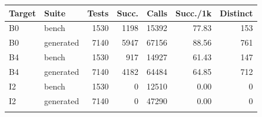 \begin{tabular}{@{}llrrrrr@{}}
\toprule
Target & Suite & Tests & Succ. & Calls & Succ./1k & Distinct \\
\midrule
B0 & bench & 1530 & 1198 & 15392 & 77.83 & 153 \\
B0 & generated & 7140 & 5947 & 67156 & 88.56 & 761 \\
B4 & bench & 1530 & 917 & 14927 & 61.43 & 147 \\
B4 & generated & 7140 & 4182 & 64484 & 64.85 & 712 \\
I2 & bench & 1530 & 0 & 12510 & 0.00 & 0 \\
I2 & generated & 7140 & 0 & 47290 & 0.00 & 0 \\
\botrule
\end{tabular}
